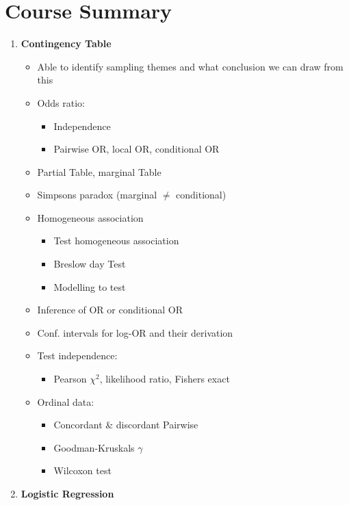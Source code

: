 \section{Course Summary}
\begin{enumerate}[leftmargin=*]
  \item\textbf{Contingency Table}
    \begin{itemize}
      \item Able to identify sampling themes and what conclusion we can draw from this
      \item Odds ratio:
        \begin{itemize}
          \item Independence
          \item Pairwise OR, local OR, conditional OR 
        \end{itemize}
        \item Partial Table, marginal Table
        \item Simpsons paradox (marginal $\neq$ conditional)
        \item Homogeneous association
          \begin{itemize}
            \item Test homogeneous association
            \item Breslow day Test
            \item Modelling to test
          \end{itemize}
        \item Inference of OR or conditional OR
        \item Conf. intervals for log-OR and their derivation
        \item Test independence:
          \begin{itemize}
            \item Pearson $\chi^2$, likelihood ratio, Fishers exact
          \end{itemize}
        \item Ordinal data:
          \begin{itemize}
            \item Concordant \& discordant Pairwise
            \item Goodman-Kruskals $\gamma$
            \item Wilcoxon test
          \end{itemize}
    \end{itemize}
    \par\bigskip
  \item\textbf{Logistic Regression}

\end{enumerate}
